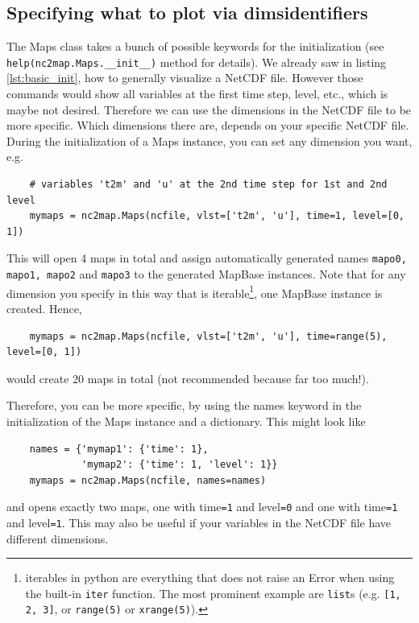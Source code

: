 \subsection{Specifying what to plot via \glspl*{dimsidentifier}} \label{sec:init_dims}
The \gls{Maps} class takes a bunch of possible keywords for the initialization (see \lstinline|help(nc2map.Maps.__init__)| method for details). We already saw in listing \ref{lst:basic_init}, how to generally visualize a NetCDF file. However those commands would show all variables at the first time step, level, etc., which is maybe not desired. Therefore we can use the dimensions in the NetCDF file to be more specific. Which dimensions there are, depends on your specific NetCDF file. During the initialization of a \gls{Maps} instance, you can set any dimension you want, e.g.
\begin{lstlisting}
	# variables 't2m' and 'u' at the 2nd time step for 1st and 2nd level
	mymaps = nc2map.Maps(ncfile, vlst=['t2m', 'u'], time=1, level=[0, 1])
\end{lstlisting}
This will open 4 maps in total and assign automatically generated names \lstinline|mapo0, mapo1, mapo2| and \lstinline|mapo3| to the generated \gls{MapBase} instances. Note that for any dimension you specify in this way that is iterable\footnote{iterables in python are everything that does not raise an Error when using the built-in \lstinline|iter| function. The most prominent example are \lstinline|list|s (e.g. \lstinline|[1, 2, 3]|, or \lstinline|range(5)| or \lstinline|xrange(5)|).}, one \gls{MapBase} instance is created. Hence,
\begin{lstlisting}
	mymaps = nc2map.Maps(ncfile, vlst=['t2m', 'u'], time=range(5), level=[0, 1])
\end{lstlisting}
would create 20 maps in total (not recommended because far too much!).

Therefore, you can be more specific, by using the \glspl{name} keyword in the initialization of the \gls{Maps} instance and a dictionary. This might look like
\begin{lstlisting}
	names = {'mymap1': {'time': 1},
	         'mymap2': {'time': 1, 'level': 1}}
    mymaps = nc2map.Maps(ncfile, names=names)
\end{lstlisting}
and opens exactly two maps, one with \gls{time}\lstinline|=1| and \gls{level}\lstinline|=0| and one with \gls{time}\lstinline|=1| and \gls{level}\lstinline|=1|. This may also be useful if your variables in the NetCDF file have different dimensions.

